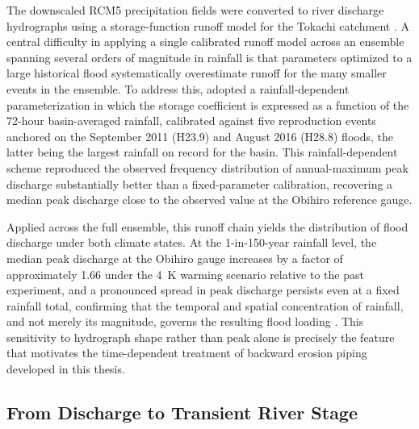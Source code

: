 The downscaled RCM5 precipitation fields were converted to river discharge hydrographs using a storage-function runoff model for the Tokachi catchment \parencite{masuya2019spatiotemporal}. A central difficulty in applying a single calibrated runoff model across an ensemble spanning several orders of magnitude in rainfall is that parameters optimized to a large historical flood systematically overestimate runoff for the many smaller events in the ensemble. To address this, \textcite{uemura_phd_2025} adopted a rainfall-dependent parameterization in which the storage coefficient is expressed as a function of the 72-hour basin-averaged rainfall, calibrated against five reproduction events anchored on the September 2011 (H23.9) and August 2016 (H28.8) floods, the latter being the largest rainfall on record for the basin. This rainfall-dependent scheme reproduced the observed frequency distribution of annual-maximum peak discharge substantially better than a fixed-parameter calibration, recovering a median peak discharge close to the observed value at the Obihiro reference gauge.

Applied across the full ensemble, this runoff chain yields the distribution of flood discharge under both climate states. At the 1-in-150-year rainfall level, the median peak discharge at the Obihiro gauge increases by a factor of approximately 1.66 under the 4~K warming scenario relative to the past experiment, and a pronounced spread in peak discharge persists even at a fixed rainfall total, confirming that the temporal and spatial concentration of rainfall, and not merely its magnitude, governs the resulting flood loading \parencite{uemura_phd_2025}. This sensitivity to hydrograph shape rather than peak alone is precisely the feature that motivates the time-dependent treatment of backward erosion piping developed in this thesis.

\subsection{From Discharge to Transient River Stage}
\label{subsec: From Discharge to Transient River Stage}

